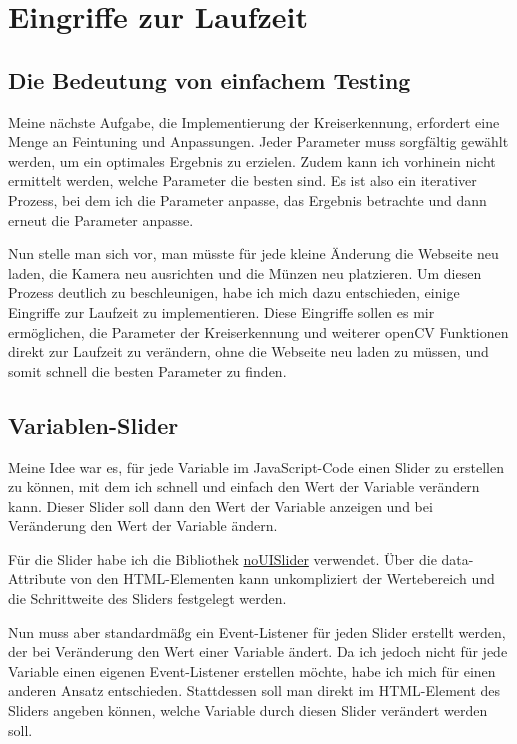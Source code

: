 \section{Eingriffe zur Laufzeit}

\subsection{Die Bedeutung von einfachem Testing}
Meine nächste Aufgabe, die Implementierung der Kreiserkennung, erfordert eine Menge an Feintuning und Anpassungen. Jeder Parameter muss sorgfältig gewählt werden, um ein optimales Ergebnis zu erzielen. Zudem kann ich vorhinein nicht ermittelt werden, welche Parameter die besten sind. Es ist also ein iterativer Prozess, bei dem ich die Parameter anpasse, das Ergebnis betrachte und dann erneut die Parameter anpasse.

Nun stelle man sich vor, man müsste für jede kleine Änderung die Webseite neu laden, die Kamera neu ausrichten und die Münzen neu platzieren. Um diesen Prozess deutlich zu beschleunigen, habe ich mich dazu entschieden, einige Eingriffe zur Laufzeit zu implementieren. Diese Eingriffe sollen es mir ermöglichen, die Parameter der Kreiserkennung und weiterer openCV Funktionen direkt zur Laufzeit zu verändern, ohne die Webseite neu laden zu müssen, und somit schnell die besten Parameter zu finden.

\subsection{Variablen-Slider}
Meine Idee war es, für jede Variable im JavaScript-Code einen Slider zu erstellen zu können, mit dem ich schnell und einfach den Wert der Variable verändern kann. Dieser Slider soll dann den Wert der Variable anzeigen und bei Veränderung den Wert der Variable ändern.

Für die Slider habe ich die Bibliothek \href{https://refreshless.com/nouislider/}{noUISlider} verwendet.  Über die data-Attribute von den HTML-Elementen kann unkompliziert der Wertebereich und die Schrittweite des Sliders festgelegt werden.

Nun muss aber standardmäßg ein Event-Listener für jeden Slider erstellt werden, der bei Veränderung den Wert einer Variable ändert. Da ich jedoch nicht für jede Variable einen eigenen Event-Listener erstellen möchte, habe ich mich für einen anderen Ansatz entschieden. Stattdessen soll man direkt im HTML-Element des Sliders angeben können, welche Variable durch diesen Slider verändert werden soll.

